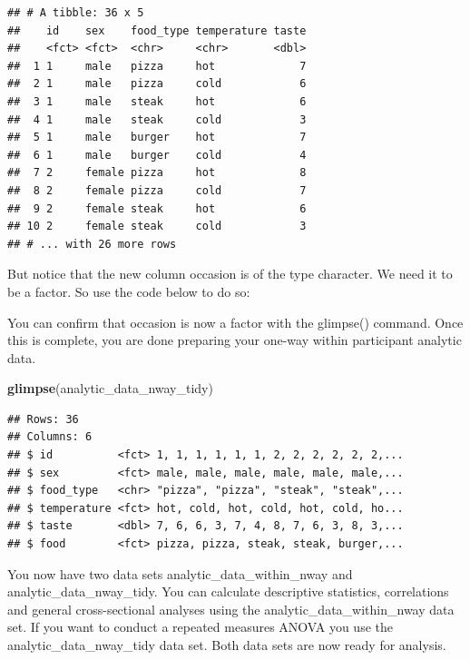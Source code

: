 \documentclass[
]{krantz}
\makeatletter
\newenvironment{Shaded}{\begin{snugshade}}{\end{snugshade}}
\newcommand{\DataTypeTok}[1]{\textcolor[rgb]{0.27,0.27,0.27}{#1}}
\newcommand{\KeywordTok}[1]{\textcolor[rgb]{0.27,0.27,0.27}{\textbf{#1}}}
\newcommand{\NormalTok}[1]{#1}
\newcommand{\OperatorTok}[1]{\textcolor[rgb]{0.43,0.43,0.43}{\textbf{#1}}}
\newcommand{\StringTok}[1]{\textcolor[rgb]{0.5,0.5,0.5}{#1}}
\newenvironment{kframe}{%
\medskip{}
\setlength{\fboxsep}{.8em}
 \def\at@end@of@kframe{}%
 \ifinner\ifhmode%
  \def\at@end@of@kframe{\end{minipage}}%
  \begin{minipage}{\columnwidth}%
 \fi\fi%
 \def\FrameCommand##1{\hskip\@totalleftmargin \hskip-\fboxsep
 \colorbox{shadecolor}{##1}\hskip-\fboxsep
     \hskip-\linewidth \hskip-\@totalleftmargin \hskip\columnwidth}%
 \MakeFramed {\advance\hsize-\width
   \@totalleftmargin\z@ \linewidth\hsize
   \@setminipage}}%
 {\par\unskip\endMakeFramed%
 \at@end@of@kframe}
\renewenvironment{Shaded}{\begin{kframe}}{\end{kframe}}
\makeatother
\begin{document}
\begin{verbatim}
## # A tibble: 36 x 5
##    id    sex    food_type temperature taste
##    <fct> <fct>  <chr>     <chr>       <dbl>
##  1 1     male   pizza     hot             7
##  2 1     male   pizza     cold            6
##  3 1     male   steak     hot             6
##  4 1     male   steak     cold            3
##  5 1     male   burger    hot             7
##  6 1     male   burger    cold            4
##  7 2     female pizza     hot             8
##  8 2     female pizza     cold            7
##  9 2     female steak     hot             6
## 10 2     female steak     cold            3
## # ... with 26 more rows
\end{verbatim}

But notice that the new column occasion is of the type character. We need it to be a factor. So use the code below to do so:

\begin{Shaded}
\end{Shaded}

You can confirm that occasion is now a factor with the glimpse() command. Once this is complete, you are done preparing your one-way within participant analytic data.

\begin{Shaded}
\begin{Highlighting}[]
\KeywordTok{glimpse}\NormalTok{(analytic_data_nway_tidy)}
\end{Highlighting}
\end{Shaded}

\begin{verbatim}
## Rows: 36
## Columns: 6
## $ id          <fct> 1, 1, 1, 1, 1, 1, 2, 2, 2, 2, 2, 2,...
## $ sex         <fct> male, male, male, male, male, male,...
## $ food_type   <chr> "pizza", "pizza", "steak", "steak",...
## $ temperature <fct> hot, cold, hot, cold, hot, cold, ho...
## $ taste       <dbl> 7, 6, 6, 3, 7, 4, 8, 7, 6, 3, 8, 3,...
## $ food        <fct> pizza, pizza, steak, steak, burger,...
\end{verbatim}

You now have two data sets analytic\_data\_within\_nway and analytic\_data\_nway\_tidy. You can calculate descriptive statistics, correlations and general cross-sectional analyses using the analytic\_data\_within\_nway data set. If you want to conduct a repeated measures ANOVA you use the analytic\_data\_nway\_tidy data set. Both data sets are now ready for analysis.
\end{document}
